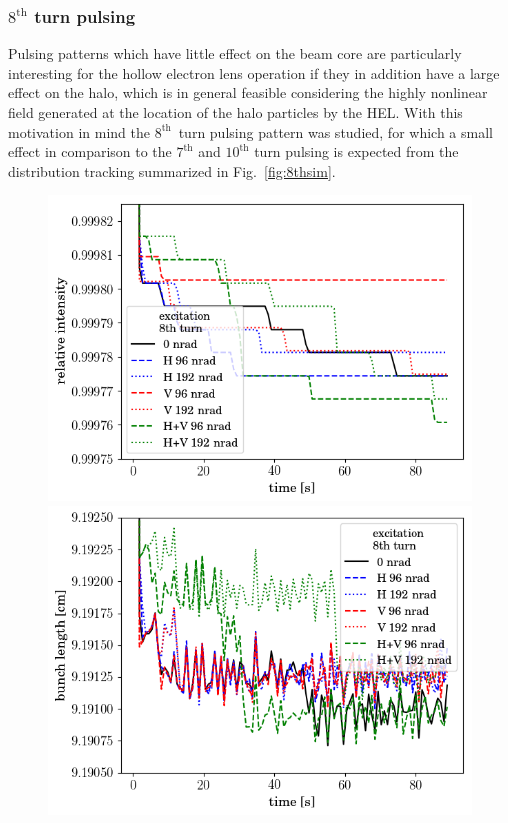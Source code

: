 \documentclass[%
 reprint,
 amsmath,amssymb,
 aps,
prstab,
]{revtex4-1}
\begin{document}
\subsubsection{$8^{\mathrm{th}}$ turn pulsing\label{sec:simex8}}
Pulsing patterns which have little effect on the beam core are particularly interesting for the hollow electron lens operation if they in addition have a large effect on the halo, which is in general feasible considering the highly nonlinear field generated at the location of the halo particles by the HEL. With this motivation in mind the $8^{\mathrm{th}}$~turn pulsing pattern was studied, for which a small effect in comparison to the $7^{\mathrm{th}}$ and $10^{\mathrm{th}}$ turn pulsing is expected from the distribution tracking summarized in Fig.~\ref{fig:8thsim}.
\begin{figure}[h]
	\begin{minipage}[t]{0.49\linewidth}
		\centering
		\includegraphics[width=1.0\linewidth]{2017injerra2b2uran1_2e-3_8th_3_5um_intensity.png}
	\end{minipage}
	\begin{minipage}[t]{0.49\linewidth}
		\centering
		\includegraphics[width=1.0\linewidth]{2017injerra2b2uran1_2e-3_8th_3_5um_sigm.png}

\end{minipage}
\end{figure}
\end{document}
